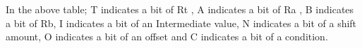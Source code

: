 \documentclass[10pt]{article}
\begin{document}
 In the above table; T indicates a bit of Rt , A indicates a bit of Ra , B indicates a bit of Rb, I indicates a bit of an Intermediate value, N indicates a bit of a shift amount, O indicates a bit of an offset and C indicates a bit of a condition.
	
	\newpage
	\printbibliography
	\newpage
	
    
    
    
            
         
    
    
\end{document}
